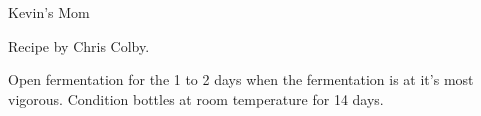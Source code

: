 \begin{recipe}{Kevin's Mom} %

\begin{aboutblock}
Recipe by Chris Colby. 
\end{aboutblock}


\begin{methodandtiming}
 
\begin{mashsteps}
\end{mashsteps}

\begin{fermentationsteps}
\end{fermentationsteps}

\begin{directions}
Open fermentation for the 1 to 2 days when the fermentation is at
it's most vigorous. Condition bottles at room temperature for 14 days.
\end{directions}

\end{methodandtiming}

\recipebreak

\begin{ingredientsblock}

\begin{malts}
\end{malts}

\begin{hops}
\end{hops}

\begin{yeastsx}
\end{yeastsx}

\begin{twists}
\end{twists}

\end{ingredientsblock}

\end{recipe}

